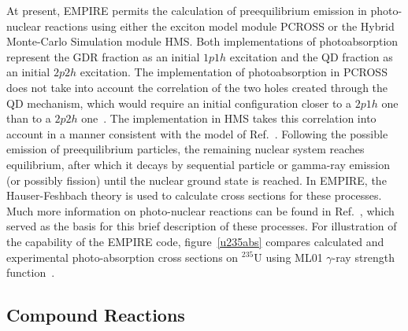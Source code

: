 \documentclass[twocolumn,amsmath,amssymb,10pt,groupedaddress,letter]{revtex4}
\begin{document}
At present, EMPIRE permits the calculation of
preequilibrium emission in photo-nuclear reactions using either the
exciton model module PCROSS or the Hybrid Monte-Carlo
Simulation module HMS. Both implementations of photoabsorption
represent the GDR fraction as an initial $1p1h$ excitation and the
QD fraction as an initial $2p2h$ excitation. The implementation of
photoabsorption in PCROSS does not take into account the correlation
of the two holes created through the QD mechanism, which would require
an initial configuration closer to a $2p1h$ one than to a $2p2h$
one~\cite{PHNuc}. The implementation in HMS takes this correlation
into account in a manner consistent with the model of Ref.~\cite{chadQD}.
Following the possible emission of preequilibrium particles, the remaining
nuclear system reaches equilibrium, after which it decays by sequential
particle or gamma-ray emission (or possibly fission) until the nuclear
ground state is reached. In EMPIRE, the Hauser-Feshbach theory is
used to calculate cross sections for these processes.
Much more information on photo-nuclear reactions can be found in
Ref.~\cite{PHNuc}, which served as the basis for this brief description
of these processes.
For illustration of the capability of the EMPIRE code, figure~\ref{u235abs}
compares calculated and experimental photo-absorption
cross sections on $^{235}$U using ML01 $\gamma$-ray strength
function~\cite{mike2}.



\subsection{Compound Reactions}
\end{document}
